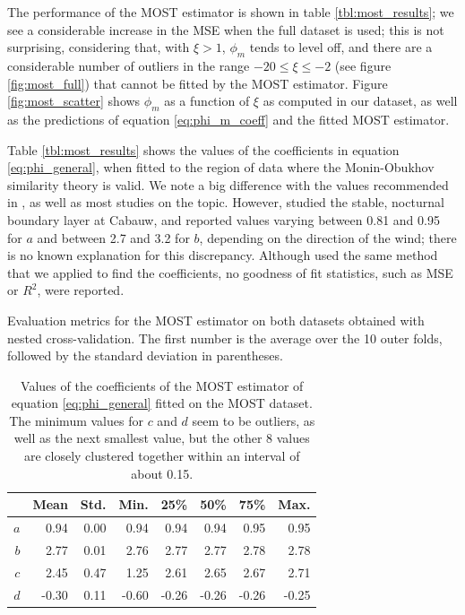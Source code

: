 \documentclass[a4paper,11pt]{kth-mag}
\begin{document}
The performance of the MOST estimator is shown in table \ref{tbl:most_results}; we see a considerable increase in the MSE when the full dataset is used; this is not surprising, considering that, with $\xi>1$, $\phi_m$ tends to level off, and there are a considerable number of outliers in the range $-20\leq\xi\leq-2$ (see figure \ref{fig:most_full}) that cannot be fitted by the MOST estimator. Figure \ref{fig:most_scatter} shows $\phi_m$ as a function of $\xi$ as computed in our dataset, as well as the predictions of equation \ref{eq:phi_m_coeff} and the fitted MOST estimator.
 
Table \ref{tbl:most_results} shows the values of the coefficients in equation \ref{eq:phi_general}, when fitted to the region of data where the Monin-Obukhov similarity theory is valid. We note a big difference with the values recommended in \cite{hogstrom88}, as well as most studies on the topic. However, \cite{cabauw_night_most} studied the stable, nocturnal boundary layer at Cabauw, and reported values varying between 0.81 and 0.95 for $a$ and between 2.7 and 3.2 for $b$, depending on the direction of the wind; there is no known explanation for this discrepancy. Although \cite{cabauw_night_most} used the same method that we applied to find the coefficients, no goodness of fit statistics, such as MSE or $R^2$, were reported.

\begin{table}[]
\centering
\caption{Evaluation metrics for the MOST estimator on both datasets obtained with nested cross-validation. The first number is the average over the 10 outer folds, followed by the standard deviation in parentheses.}
\label{tbl:most_results}

\end{table}

\begin{table}[]
\centering
\caption{Values of the coefficients of the MOST estimator of equation \ref{eq:phi_general} fitted on the MOST dataset. The minimum values for $c$ and $d$ seem to be outliers, as well as the next smallest value, but the other 8 values are closely clustered together within an interval of about 0.15.}
\label{tbl:most_coeffs}
\begin{tabular}{r|rrrrrrr}
\toprule
   & \textbf{Mean} & \textbf{Std.} & \textbf{Min.} & \textbf{25\%} & \textbf{50\%} & \textbf{75\%} & \textbf{Max.} \\ \midrule
$a$ & 0.94 & 0.00 & 0.94 & 0.94 & 0.94 & 0.95 & 0.95 \\
$b$ & 2.77 & 0.01 & 2.76 & 2.77 & 2.77 & 2.78 & 2.78 \\
$c$ & 2.45 & 0.47 & 1.25 & 2.61 & 2.65 & 2.67 & 2.71 \\
$d$ & -0.30 & 0.11 & -0.60 & -0.26 & -0.26 & -0.26 & -0.25 \\
\bottomrule
\end{tabular}
\end{table}
\end{document}
